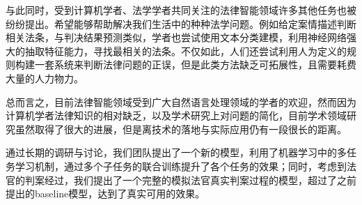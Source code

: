 
与此同时，受到计算机学者、法学学者共同关注的法律智能领域许多其他任务也被纷纷提出。希望能够帮助解决我们生活中的种种法学问题。例如给定案情描述判断相关法条，与判决结果预测类似，学者也尝试使用文本分类建模，利用神经网络强大的抽取特征能力，寻找最相关的法条。不仅如此，人们还尝试利用人为定义的规则构建一套系统来判断法律问题的正误，但是此类方法缺乏可拓展性，且需要耗费大量的人力物力。


总而言之，目前法律智能领域受到广大自然语言处理领域的学者的欢迎，然而因为计算机学者法律知识的相对缺乏，以及学术研究上对问题的简化，目前学术领域研究虽然取得了很大的进展，但是离技术的落地与实际应用仍有一段很长的距离。

通过长期的调研与讨论，我们团队提出了一个新的模型，利用了机器学习中的多任务学习机制，通过多个子任务的联合训练提升了各个任务的效果；同时，考虑到法官的判案经过，我们提出了一个完整的模拟法官真实判案过程的模型，超过了之前提出的baseline模型，达到了真实可用的效果。




